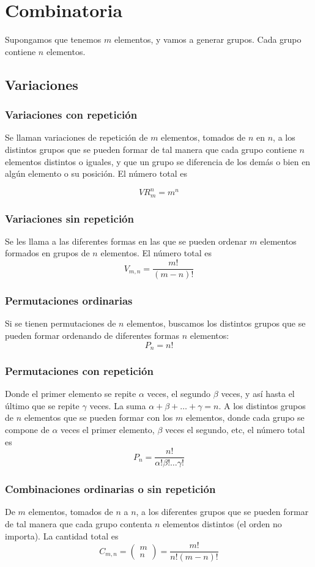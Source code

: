 \documentclass{./Probabilidad.tex}
\begin{document}
\chapter{Combinatoria}
Supongamos que tenemos $m$ elementos, y vamos a generar grupos. Cada grupo contiene $n$ elementos.
\section{Variaciones}
\subsection{Variaciones con repetición}
Se llaman variaciones de repetición de $m$ elementos, tomados de $n$ en $n$, a los distintos grupos que se pueden formar de tal manera que cada grupo contiene $n$ elementos distintos o iguales, y que un grupo se diferencia de los demás o bien en algún elemento o su posición.
El número total es

$$
VR_{m}^n=m^{n}
$$
\subsection{Variaciones sin repetición}
Se les llama a las diferentes formas en las que se pueden ordenar $m$ elementos formados en grupos de $n$ elementos. El número total es
$$
V_{m,n}=\frac{m!}{(m-n)!}
$$
\subsection{Permutaciones ordinarias}
Si se tienen permutaciones de $n$ elementos, buscamos los distintos grupos que se pueden formar ordenando de diferentes formas $n$ elementos:
$$
P_{n}=n!
$$
\subsection{Permutaciones con repetición}
Donde el primer elemento se repite $\alpha$ veces, el segundo $\beta$ veces, y así hasta el último que se repite $\gamma$ veces. La suma $\alpha+\beta+\dots+\gamma=n$. A los distintos grupos de $n$ elementos que se pueden formar con los $m$ elementos, donde cada grupo se compone de $\alpha$ veces el primer elemento, $\beta$ veces el segundo, etc, el número total es
$$
P_{n}= \frac{n!}{\alpha!\beta!\dots\gamma!}
$$
\subsection{Combinaciones ordinarias o sin repetición}
De $m$ elementos, tomados de $n$ a $n$, a los diferentes grupos que se pueden formar de tal manera que cada grupo contenta $n$ elementos distintos (el orden no importa). La cantidad total es
$$
C_{m,n} = \begin{pmatrix}
m \\ n
\end{pmatrix} = \frac{m!}{n!(m-n)!}
$$
\end{document}
